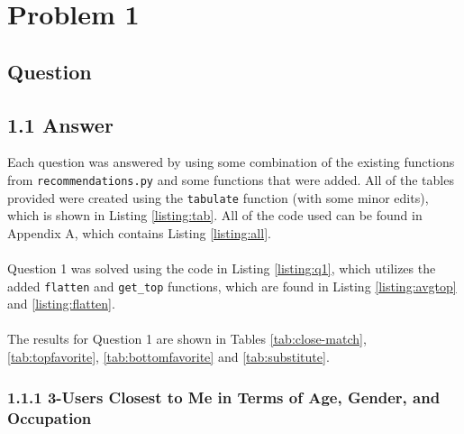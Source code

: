 \section{Problem 1}

\subsection{Question}
\vspace*{10pt}


\subsection{1.1 Answer}

Each question was answered by using some combination of the existing functions from {\tt recommendations.py} and some functions that were added. All of the tables provided were created using the {\tt tabulate} function (with some minor edits), which is shown in Listing \ref{listing:tab}. All of the code used can be found in Appendix A, which contains Listing \ref{listing:all}.\\
\\
Question 1 was solved using the code in Listing \ref{listing:q1}, which utilizes the added {\tt flatten} and {\tt get\_top} functions, which are found in Listing \ref{listing:avgtop} and \ref{listing:flatten}.\\
\\
The results for Question 1 are shown in Tables \ref{tab:close-match}, \ref{tab:topfavorite}, \ref{tab:bottomfavorite} and \ref{tab:substitute}. 

\clearpage









\clearpage
\subsubsection{1.1.1 3-Users Closest to Me in Terms of Age, Gender, and Occupation}

